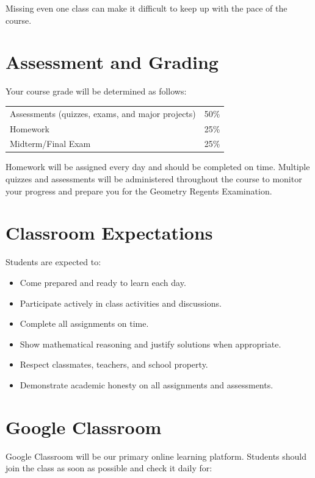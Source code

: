 \documentclass[10pt]{article}
\begin{document}
Missing even one class can make it difficult to keep up with the pace of the course.

\section*{Assessment and Grading}

Your course grade will be determined as follows:

\begin{center}
\begin{tabular}{lr}
Assessments (quizzes, exams, and major projects) & 50\% \\
Homework & 25\% \\
Midterm/Final Exam & 25\%
\end{tabular}
\end{center}

Homework will be assigned every day and should be completed on time. Multiple quizzes and assessments will be administered throughout the course to monitor your progress and prepare you for the Geometry Regents Examination.

\section*{Classroom Expectations}

Students are expected to:

\begin{itemize}
    \item Come prepared and ready to learn each day.
    \item Participate actively in class activities and discussions.
    \item Complete all assignments on time.
    \item Show mathematical reasoning and justify solutions when appropriate.
    \item Respect classmates, teachers, and school property.
    \item Demonstrate academic honesty on all assignments and assessments.
\end{itemize}

\section*{Google Classroom}

Google Classroom will be our primary online learning platform. Students should join the class as soon as possible and check it daily for:
\end{document}
